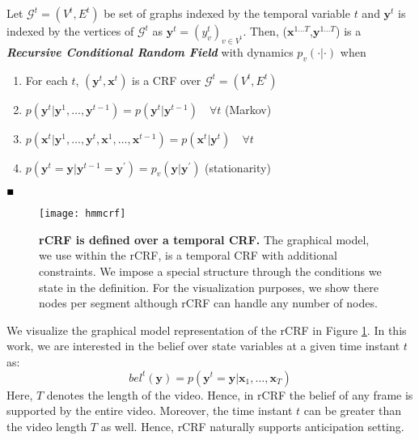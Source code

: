 \begin{mydef}
Let $\mathcal{G}^t=(V^t,E^t)$ be set of graphs indexed by the temporal variable $t$ and $\mathbf{y}^t$ is indexed by the vertices of $\mathcal{G}^t$ as $\mathbf{y}^t=(y^t_v)_{v \in V^t}$. Then, ($\mathbf{x}^{1\ldots T}$,$\mathbf{y}^{1\ldots T}$) is a \textbf{\textit{Recursive Conditional Random Field}} with dynamics $p_v(\cdot|\cdot)$ when

\begin{enumerate}
	\item For each $t$, $(\mathbf{y}^t,\mathbf{x}^t)$ is a CRF over $\mathcal{G}^t=(V^t,E^t)$
\item $p(\mathbf{y}^{t}|\mathbf{y}^{1},\ldots,\mathbf{y}^{t-1}) = p(\mathbf{y}^{t}|\mathbf{y}^{t-1}) \quad  \forall t$ \hfill (Markov)
\item $p(\mathbf{x}^t|\mathbf{y}^1,\ldots,\mathbf{y}^t,\mathbf{x}^1,\ldots,\mathbf{x}^{t-1})=p(\mathbf{x}^t|\mathbf{y}^t)\quad  \forall t$ \hfill
\item $p(\mathbf{y}^t=\mathbf{y}|\mathbf{y}^{t-1}=\mathbf{y^\prime})=p_v(\mathbf{y}|\mathbf{y^\prime})$ \hfill (stationarity)
\end{enumerate}
$\hfill \blacksquare$
\end{mydef}
\begin{figure}[ht]
\texttt{[image: hmmcrf]}
\caption{{\bf rCRF is defined over a temporal CRF.} The graphical model, we use within the rCRF, is a temporal CRF with additional constraints. We impose a special structure through the conditions we state in the definition. For the visualization purposes, we show there nodes per segment although rCRF can handle any number of nodes.}%
\label{rCrf}
\end{figure}

We visualize the graphical model representation of the rCRF in Figure \ref{rCrf}. In this work, we are interested in the belief over state variables at a given time instant $t$ as:
\begin{equation}
bel^t(\mathbf{y}) = p(\mathbf{y}^t=\mathbf{y}|\mathbf{x}_1,\ldots,\mathbf{x}_T) \label{beldef}
\end{equation}
Here, $T$ denotes the length of the video. Hence, in rCRF the belief of any frame is supported by the entire video. Moreover, the time instant $t$ can be greater than the video length $T$ as well. Hence, rCRF naturally supports anticipation setting.

